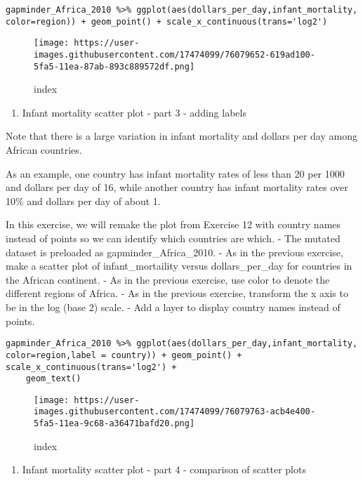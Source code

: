 \documentclass[]{article}
\providecommand{\tightlist}{%
  \setlength{\itemsep}{0pt}\setlength{\parskip}{0pt}}
\begin{document}
\begin{verbatim}
gapminder_Africa_2010 %>% ggplot(aes(dollars_per_day,infant_mortality, color=region)) + geom_point() + scale_x_continuous(trans='log2')
\end{verbatim}

\begin{figure}
\centering
\texttt{[image: https://user-images.githubusercontent.com/17474099/76079652-619ad100-5fa5-11ea-87ab-893c889572df.png]}
\caption{index}
\end{figure}

\begin{enumerate}
\def\labelenumi{\arabic{enumi}.}
\setcounter{enumi}{12}
\tightlist
\item
  Infant mortality scatter plot - part 3 - adding labels
\end{enumerate}

Note that there is a large variation in infant mortality and dollars per
day among African countries.

As an example, one country has infant mortality rates of less than 20
per 1000 and dollars per day of 16, while another country has infant
mortality rates over 10\% and dollars per day of about 1.

In this exercise, we will remake the plot from Exercise 12 with country
names instead of points so we can identify which countries are which. -
The mutated dataset is preloaded as gapminder\_Africa\_2010. - As in the
previous exercise, make a scatter plot of infant\_mortaility versus
dollars\_per\_day for countries in the African continent. - As in the
previous exercise, use color to denote the different regions of Africa.
- As in the previous exercise, transform the x axis to be in the log
(base 2) scale. - Add a layer to display country names instead of
points.

\begin{verbatim}
gapminder_Africa_2010 %>% ggplot(aes(dollars_per_day,infant_mortality, color=region,label = country)) + geom_point() + scale_x_continuous(trans='log2') +
    geom_text()
\end{verbatim}

\begin{figure}
\centering
\texttt{[image: https://user-images.githubusercontent.com/17474099/76079763-acb4e400-5fa5-11ea-9c68-a36471bafd20.png]}
\caption{index}
\end{figure}

\begin{enumerate}
\def\labelenumi{\arabic{enumi}.}
\setcounter{enumi}{13}
\tightlist
\item
  Infant mortality scatter plot - part 4 - comparison of scatter plots
\end{enumerate}
\end{document}
